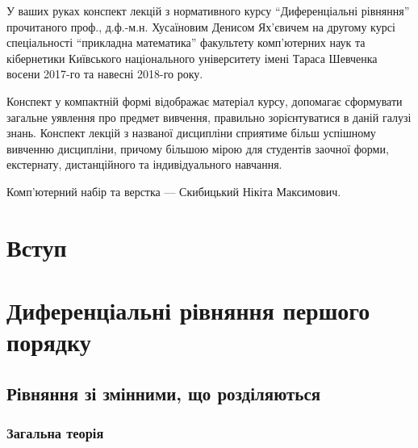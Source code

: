 




\maketitle \thispagestyle{empty} \newpage 

У ваших руках конспект лекцій з нормативного курсу ``Диференціальні рівняння'' прочитаного проф., д.ф.-м.н. Хусаїновим Денисом Ях'євичем на другому курсі спеціальності ``прикладна математика'' факультету ком\-п'ю\-тер\-них наук та кібернетики Київського національного університету імені Тараса Шевченка восени 2017-го та навесні 2018-го року. \parvskip

Конспект у компактній формі відображає матеріал курсу, допомагає сформувати загальне уявлення про предмет вивчення, правильно зорієнтуватися в даній галузі знань. Конспект лекцій з названої дисципліни сприятиме більш успішному вивченню дисципліни, причому більшою мірою для студентів заочної форми, екстернату, дистанційного та індивідуального навчання. \parvskip

Комп'ютерний набір та верстка --- Скибицький Нікіта Максимович. \newpage

\tableofcontents \newpage

\section*{Вступ}


\section{Диференціальні рівняння першого порядку}


	\subsection{Рівняння зі змінними, що розділяються}
	

		\subsubsection{Загальна теорія}
		

